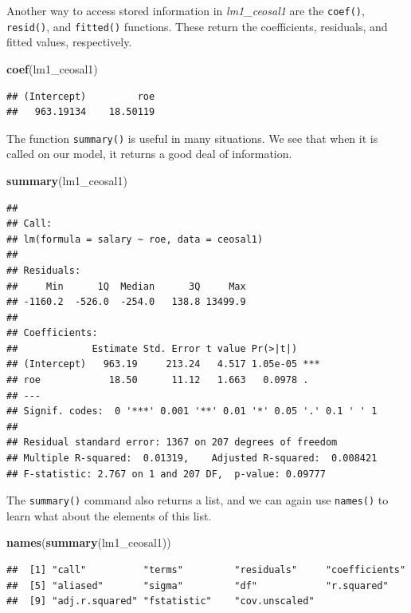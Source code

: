 \documentclass[]{book}
\newenvironment{Shaded}{\begin{snugshade}}{\end{snugshade}}
\newcommand{\KeywordTok}[1]{\textcolor[rgb]{0.13,0.29,0.53}{\textbf{#1}}}
\newcommand{\NormalTok}[1]{#1}
\begin{document}
Another way to access stored information in \emph{lm1\_ceosal1} are the
\texttt{coef()}, \texttt{resid()}, and \texttt{fitted()} functions.
These return the coefficients, residuals, and fitted values,
respectively.

\begin{Shaded}
\begin{Highlighting}[]
\KeywordTok{coef}\NormalTok{(lm1_ceosal1)}
\end{Highlighting}
\end{Shaded}

\begin{verbatim}
## (Intercept)         roe 
##   963.19134    18.50119
\end{verbatim}

The function \texttt{summary()} is useful in many situations. We see
that when it is called on our model, it returns a good deal of
information.

\begin{Shaded}
\begin{Highlighting}[]
\KeywordTok{summary}\NormalTok{(lm1_ceosal1)}
\end{Highlighting}
\end{Shaded}

\begin{verbatim}
## 
## Call:
## lm(formula = salary ~ roe, data = ceosal1)
## 
## Residuals:
##     Min      1Q  Median      3Q     Max 
## -1160.2  -526.0  -254.0   138.8 13499.9 
## 
## Coefficients:
##             Estimate Std. Error t value Pr(>|t|)    
## (Intercept)   963.19     213.24   4.517 1.05e-05 ***
## roe            18.50      11.12   1.663   0.0978 .  
## ---
## Signif. codes:  0 '***' 0.001 '**' 0.01 '*' 0.05 '.' 0.1 ' ' 1
## 
## Residual standard error: 1367 on 207 degrees of freedom
## Multiple R-squared:  0.01319,    Adjusted R-squared:  0.008421 
## F-statistic: 2.767 on 1 and 207 DF,  p-value: 0.09777
\end{verbatim}

The \texttt{summary()} command also returns a list, and we can again use
\texttt{names()} to learn what about the elements of this list.

\begin{Shaded}
\begin{Highlighting}[]
\KeywordTok{names}\NormalTok{(}\KeywordTok{summary}\NormalTok{(lm1_ceosal1))}
\end{Highlighting}
\end{Shaded}

\begin{verbatim}
##  [1] "call"          "terms"         "residuals"     "coefficients" 
##  [5] "aliased"       "sigma"         "df"            "r.squared"    
##  [9] "adj.r.squared" "fstatistic"    "cov.unscaled"
\end{verbatim}
\end{document}
